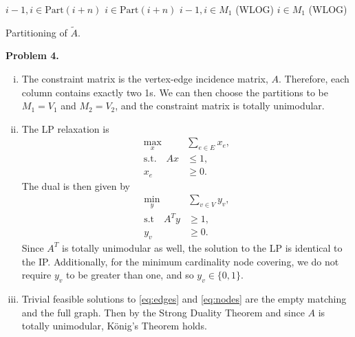 \documentclass[11pt,a4paper]{article}
\begin{document}
\begin{enumerate}[i)]
\begin{algorithm}[tbp]
\begin{algorithmic}
					\State $i-1, i \in \text{Part}(i+n)$
					\State $i \in \text{Part}(i+n)$
					\State $i-1, i \in M_1$ (WLOG)
				\Else
					\State $i \in M_1$ (WLOG)
				\EndIf
			\EndFor
	    \end{algorithmic}
	    \caption{Partitioning of $\widetilde{A}$.}
	    \label{alg:part}
	\end{algorithm}
\end{enumerate}

\textbf{Problem 4.}
\begin{enumerate}[i)]
	\item The constraint matrix is the vertex-edge incidence matrix, $A$. Therefore, each column contains exactly two 1s. We can then choose the partitions to be $M_1 = V_1$ and $M_2 = V_2$, and the constraint matrix is totally unimodular.
	\item The LP relaxation is
	\begin{align}
		\nonumber \max_x & \sum_{e \in E} x_e, \\
		\text{s.t.} \quad A x &\leq 1, \label{eq:edges} \\
		\nonumber x_e &\geq 0.
	\end{align}
	The dual is then given by
	\begin{align}
		\nonumber \min_y & \sum_{v \in V} y_v, \\
		\text{s.t} \quad A^T y &\geq 1, \label{eq:nodes} \\
		\nonumber y_v &\geq 0.
	\end{align}
	Since $A^T$ is totally unimodular as well, the solution to the LP is identical to the IP. Additionally, for the minimum cardinality node covering, we do not require $y_v$ to be greater than one, and so $y_v \in \{ 0, 1 \}$.
	\item Trivial feasible solutions to \eqref{eq:edges} and \eqref{eq:nodes} are the empty matching and the full graph. Then by the Strong Duality Theorem and since $A$ is totally unimodular, K\"{o}nig's Theorem holds.
\end{enumerate}
\end{document}

